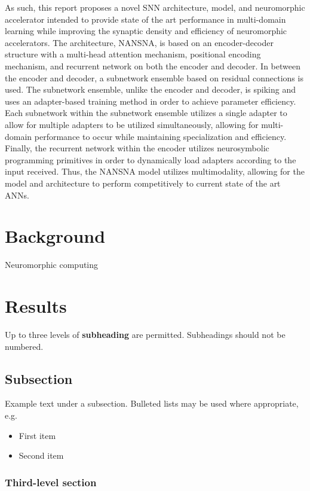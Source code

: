 \documentclass[fleqn,10pt]{wlscirep}
\begin{document}
As such, this report proposes a novel SNN architecture, model, and neuromorphic accelerator intended to provide state of the art performance in multi-domain learning while improving the synaptic density and efficiency of neuromorphic accelerators. The architecture, NANSNA, is based on an encoder-decoder structure with a multi-head attention mechanism, positional encoding mechanism, and recurrent network on both the encoder and decoder. In between the encoder and decoder, a subnetwork ensemble based on residual connections is used. The subnetwork ensemble, unlike the encoder and decoder, is spiking and uses an adapter-based training method in order to achieve parameter efficiency. Each subnetwork within the subnetwork ensemble utilizes a single adapter to allow for multiple adapters to be utilized simultaneously, allowing for multi-domain performance to occur while maintaining specialization and efficiency. Finally, the recurrent network within the encoder utilizes neurosymbolic programming primitives in order to dynamically load adapters according to the input received. Thus, the NANSNA model utilizes multimodality, allowing for the model and architecture to perform competitively to current state of the art ANNs.

\section*{Background}

Neuromorphic computing 

\section*{Results}

Up to three levels of \textbf{subheading} are permitted. Subheadings should not be numbered.

\subsection*{Subsection}

Example text under a subsection. Bulleted lists may be used where appropriate, e.g.

\begin{itemize}
\item First item
\item Second item
\end{itemize}

\subsubsection*{Third-level section}
 
\end{document}
